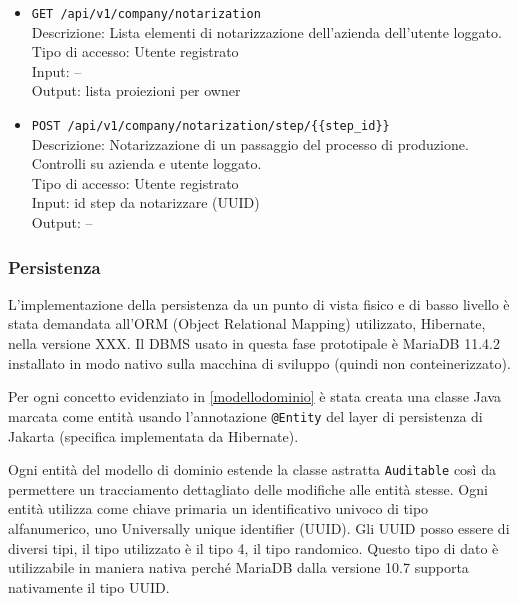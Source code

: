 \documentclass[a4paper,11pt]{article}
\begin{document}
\begin{itemize}
  \item \texttt{GET /api/v1/company/notarization}
        \\ Descrizione: Lista elementi di notarizzazione dell'azienda dell'utente loggato.
        \\ Tipo di accesso: Utente registrato
        \\ Input: --
        \\ Output: lista proiezioni per owner

  \item \texttt{POST /api/v1/company/notarization/step/\{\{step\_id\}\}}
        \\ Descrizione: Notarizzazione di un passaggio del processo di produzione. Controlli su azienda e utente loggato.
        \\ Tipo di accesso: Utente registrato
        \\ Input: id step da notarizzare (UUID)
        \\ Output: --

\end{itemize}

\subsubsection{Persistenza}

L'implementazione della persistenza da un punto di vista fisico e di basso livello è stata demandata all'ORM (Object Relational Mapping) utilizzato, Hibernate, nella versione XXX. Il DBMS usato in questa fase prototipale è MariaDB 11.4.2 installato in modo nativo sulla macchina di sviluppo (quindi non conteinerizzato).

Per ogni concetto evidenziato in \ref{modellodominio} è stata creata una classe Java marcata come entità usando l'annotazione \texttt{@Entity} del layer di persistenza di Jakarta (specifica implementata da Hibernate).

Ogni entità del modello di dominio estende la classe astratta \texttt{Auditable} così da permettere un tracciamento dettagliato delle modifiche alle entità stesse.
Ogni entità utilizza come chiave primaria un identificativo univoco di tipo alfanumerico, uno Universally unique identifier (UUID). Gli UUID posso essere di diversi tipi, il tipo utilizzato è il tipo 4, il tipo randomico. Questo tipo di dato è utilizzabile in maniera nativa perché MariaDB dalla versione 10.7 \cite{mariadbUUIDData} supporta nativamente il tipo UUID.
\end{document}
